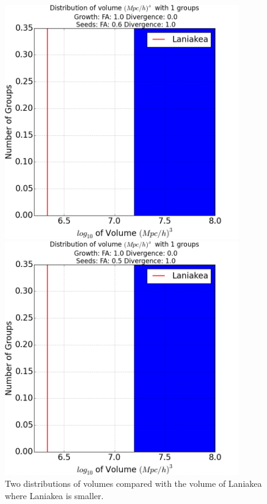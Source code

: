 \documentclass[12pt]{article}
\begin{document}
\begin{figure}[ht]
\centering
\begin{minipage}{.5\textwidth}
  \centering
  \includegraphics[width=0.9\textwidth]{groups/volumeplots/volumes_distr_Mpc_laniakea_06_Trace_10_search_FA_10_Trace_00.png} %
\end{minipage}%
\begin{minipage}{.5\textwidth}
  \centering
  \includegraphics[width=0.9\textwidth]{groups/volumeplots/volumes_distr_Mpc_laniakea_05_Trace_10_search_FA_10_Trace_00.png}
\end{minipage}
\caption{Two distributions of volumes compared with the volume of Laniakea where Laniakea is smaller.}
\label{fg:compare_lan_small}
\end{figure}
\FloatBarrier
\end{document}
